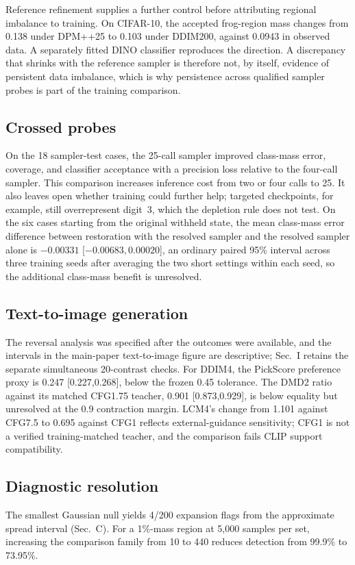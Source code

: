 Reference refinement supplies a further control before attributing
regional imbalance to training. On CIFAR-10, the accepted frog-region mass
changes from 0.138 under DPM++25 to 0.103 under DDIM200, against 0.0943 in
observed data. A separately fitted DINO classifier reproduces the
direction. A discrepancy that shrinks with the reference sampler is
therefore not, by itself, evidence of persistent data imbalance, which is
why persistence across qualified sampler probes is part of the training
comparison.

\subsection{Crossed probes}
\label{supp:boundary-crossed}
On the 18 sampler-test cases, the 25-call sampler improved class-mass
error, coverage, and classifier acceptance with a precision loss relative
to the four-call sampler. This comparison increases inference cost from
two or four calls to 25. It also leaves open whether training could
further help; targeted checkpoints, for example, still overrepresent
digit~3, which the depletion rule does not test. On the six cases starting
from the original withheld state, the mean class-mass error difference
between restoration with the resolved sampler and the resolved sampler
alone is $-0.00331$ [$-0.00683,0.00020$], an ordinary paired 95\%
interval across three training seeds after averaging the two short
settings within each seed, so the additional class-mass benefit is
unresolved.

\subsection{Text-to-image generation}
\label{supp:boundary-t2i}
The reversal analysis was specified after the outcomes were available,
and the intervals in the main-paper text-to-image figure are descriptive;
Sec.~I retains the separate simultaneous 20-contrast checks. For DDIM4,
the PickScore preference proxy is 0.247 [0.227,0.268], below the frozen
0.45 tolerance. The DMD2 ratio against its matched CFG1.75 teacher,
0.901 [0.873,0.929], is below equality but unresolved at the 0.9
contraction margin. LCM4's change from 1.101 against CFG7.5 to 0.695
against CFG1 reflects external-guidance sensitivity; CFG1 is not a
verified training-matched teacher, and the comparison fails CLIP support
compatibility.

\subsection{Diagnostic resolution}
\label{supp:boundary-resolution}
The smallest Gaussian null yields 4/200 expansion flags from the
approximate spread interval (Sec.~C). For a 1\%-mass region at 5,000
samples per set, increasing the comparison family from 10 to 440 reduces
detection from 99.9\% to 73.95\%.

